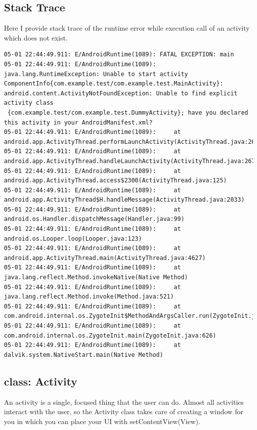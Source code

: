 \documentclass[11pt,a4paper]{article}
\begin{document}
\subsection{Stack Trace}

Here I provide stack trace of the runtime error while execution call of an activity which does not exist.
\tiny
\begin{verbatim}
05-01 22:44:49.911: E/AndroidRuntime(1089): FATAL EXCEPTION: main
05-01 22:44:49.911: E/AndroidRuntime(1089): java.lang.RuntimeException: Unable to start activity ComponentInfo{com.example.test/com.example.test.MainActivity}: android.content.ActivityNotFoundException: Unable to find explicit activity class
 {com.example.test/com.example.test.DummyActivity}; have you declared this activity in your AndroidManifest.xml?
05-01 22:44:49.911: E/AndroidRuntime(1089): 	at android.app.ActivityThread.performLaunchActivity(ActivityThread.java:2663)
05-01 22:44:49.911: E/AndroidRuntime(1089): 	at android.app.ActivityThread.handleLaunchActivity(ActivityThread.java:2679)
05-01 22:44:49.911: E/AndroidRuntime(1089): 	at android.app.ActivityThread.access$2300(ActivityThread.java:125)
05-01 22:44:49.911: E/AndroidRuntime(1089): 	at android.app.ActivityThread$H.handleMessage(ActivityThread.java:2033)
05-01 22:44:49.911: E/AndroidRuntime(1089): 	at android.os.Handler.dispatchMessage(Handler.java:99)
05-01 22:44:49.911: E/AndroidRuntime(1089): 	at android.os.Looper.loop(Looper.java:123)
05-01 22:44:49.911: E/AndroidRuntime(1089): 	at android.app.ActivityThread.main(ActivityThread.java:4627)
05-01 22:44:49.911: E/AndroidRuntime(1089): 	at java.lang.reflect.Method.invokeNative(Native Method)
05-01 22:44:49.911: E/AndroidRuntime(1089): 	at java.lang.reflect.Method.invoke(Method.java:521)
05-01 22:44:49.911: E/AndroidRuntime(1089): 	at com.android.internal.os.ZygoteInit$MethodAndArgsCaller.run(ZygoteInit.java:868)
05-01 22:44:49.911: E/AndroidRuntime(1089): 	at com.android.internal.os.ZygoteInit.main(ZygoteInit.java:626)
05-01 22:44:49.911: E/AndroidRuntime(1089): 	at dalvik.system.NativeStart.main(Native Method)
\end{verbatim}
\normalsize

\subsection{class: Activity}

An activity is a single, focused thing that the user can do. Almost all activities interact with the user, so the Activity class takes care of creating a window for you in which you can place your UI with setContentView(View).
\end{document}
